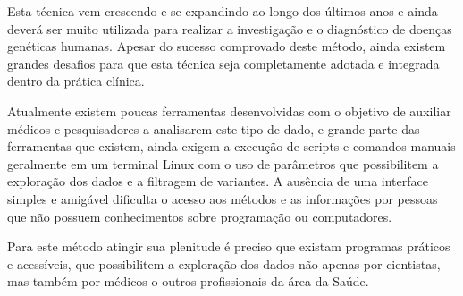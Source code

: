 
Esta técnica vem crescendo e se expandindo ao longo dos últimos anos e ainda deverá ser muito utilizada para realizar a investigação e o diagnóstico de doenças genéticas humanas. Apesar do sucesso comprovado deste método, ainda existem grandes desafios para que esta técnica seja completamente adotada e integrada dentro da prática clínica.

Atualmente existem poucas ferramentas desenvolvidas com o objetivo de auxiliar médicos e pesquisadores a analisarem este tipo de dado, e grande parte das ferramentas que existem, ainda exigem a execução de scripts e comandos manuais geralmente em um terminal Linux com o uso de parâmetros que possibilitem a exploração dos dados e a filtragem de variantes. A ausência de uma interface simples e amigável dificulta o acesso aos métodos e as informações por pessoas que não possuem conhecimentos sobre programação ou computadores.

Para este método atingir sua plenitude é preciso que existam programas práticos e acessíveis, que possibilitem a exploração dos dados não apenas por cientistas, mas também por médicos o outros profissionais da área da Saúde. 

